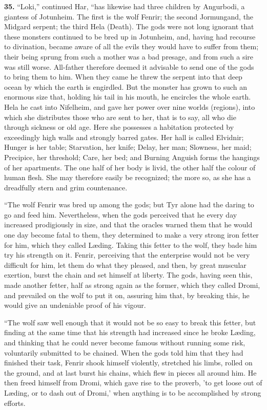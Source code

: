 \textbf{35.} ``Loki,'' continued Har, ``has likewise had three children by
Angurbodi, a giantess of Jotunheim. The first is the wolf Fenrir; the
second Jormungand, the Midgard serpent; the third Hela (Death). The
gods were not long ignorant that these monsters continued to be bred
up in Jotunheim, and, having had recourse to divination, became aware
of all the evils they would have to suffer from them; their being
sprung from such a mother was a bad presage, and from such a sire was
still worse. All-father therefore deemed it advisable to send one of
the gods to bring them to him. When they came he threw the serpent
into that deep ocean by which the earth is engirdled. But the monster
has grown to such an enormous size that, holding his tail in his
mouth, he encircles the whole earth. Hela he cast into Nifelheim, and
gave her power over nine worlds (regions), into which she distributes
those who are sent to her, that is to say, all who die through
sickness or old age. Here she possesses a habitation protected by
exceedingly high walls and strongly barred gates. Her hall is called
Elvidnir; Hunger is her table; Starvation, her knife; Delay, her man;
Slowness, her maid; Precipice, her threshold; Care, her bed; and
Burning Anguish forms the hangings of her apartments. The one half of
her body is livid, the other half the colour of human flesh. She may
therefore easily be recognized; the more so, as she has a dreadfully
stern and grim countenance.

``The wolf Fenrir was bred up among the gods; but Tyr alone had the
daring to go and feed him. Nevertheless, when the gods perceived that
he every day increased prodigiously in size, and that the oracles
warned them that he would one day become fatal to them, they
determined to make a very strong iron fetter for him, which they
called Læding. Taking this fetter to the wolf, they bade him try his
strength on it. Fenrir, perceiving that the enterprise would not be
very difficult for him, let them do what they pleased, and then, by
great muscular exertion, burst the chain and set himself at liberty.
The gods, having seen this, made another fetter, half as strong again
as the former, which they called Dromi, and prevailed on the wolf to
put it on, assuring him that, by breaking this, he would give an
undeniable proof of his vigour.

``The wolf saw well enough that it would not be so easy to break this
fetter, but finding at the same time that his strength had increased
since he broke Læding, and thinking that he could never become famous
without running some risk, voluntarily submitted to be chained. When
the gods told him that they had finished their task, Fenrir shook
himself violently, stretched his limbs, rolled on the ground, and at
last burst his chains, which flew in pieces all around him. He then
freed himself from Dromi, which gave rise to the proverb, 'to get
loose out of Læding, or to dash out of Dromi,' when anything is to be
accomplished by strong efforts.

